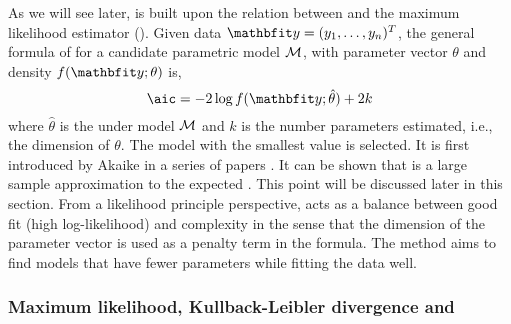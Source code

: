 As we will see later, \aic is built upon the relation between \kl and the
maximum likelihood estimator (\mle). Given data $\data = (y_1,\dots,y_n)^T$,
the general formula of \aic for a candidate parametric model $\mathcal{M}$, with
parameter vector $\theta$ and density $f(\data;\theta)$ is,
\begin{equation}
  \text{\aic} = -2\log f(\data;\hat\theta) + 2k
  \label{eq:aic}
\end{equation}
where $\hat\theta$ is the \mle under model $\mathcal{M}$ and $k$ is the number
parameters estimated, i.e., the dimension of $\theta$. The model with the
smallest \aic value is selected. It is first introduced by Akaike in a series
of papers \cite{Akaike:1973uc, Akaike:1974ih, Akaike:1977ul}. It can be shown
that \aic is a large sample approximation to the expected \kl
\cite{Akaike:1973uc,Bozdogan:1987wy}. This point will be discussed later in
this section. From a likelihood principle perspective, \aic acts as a balance
between good fit (high log-likelihood) and complexity in the sense that the
dimension of the parameter vector is used as a penalty term in the formula.
The \aic method aims to find models that have fewer parameters while fitting
the data well.

\subsubsection{Maximum likelihood, Kullback-Leibler divergence and
  \protect\aic}
\label{ssub:Maximum likelihood, Kullback-Leiber divergence and aic}

